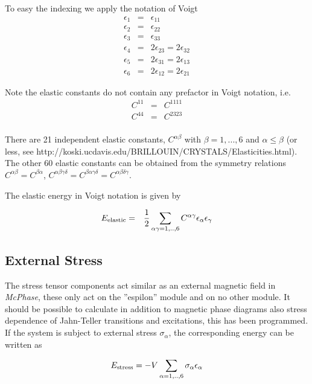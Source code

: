 To easy the indexing we apply the notation of Voigt
\begin{eqnarray}\label{voigt}
\epsilon_1&=&\epsilon_{11}  \\
\epsilon_2&=&\epsilon_{22} \nonumber \\
\epsilon_3&=&\epsilon_{33}\nonumber \\
\epsilon_4&=&2\epsilon_{23}=2\epsilon_{32}\nonumber \\
\epsilon_5&=&2\epsilon_{31}=2\epsilon_{13}\nonumber \\
\epsilon_6&=&2\epsilon_{12}=2\epsilon_{21} \nonumber
\end{eqnarray}

Note the elastic constants do not contain any prefactor in Voigt notation, i.e.
\begin{eqnarray}\label{voigtel}
C^{11}&=&C^{1111} \\
C^{44}&=&C^{2323} \nonumber \\
\end{eqnarray}

There are 21 independent elastic constants, $C^{\alpha\beta}$ with $\beta=1,...,6$ and
$\alpha \le \beta$ (or less, see  http://koski.ucdavis.edu/BRILLOUIN/CRYSTALS/Elasticities.html). The other 60 elastic constants 
can be obtained from the symmetry relations $C^{\alpha\beta}=C^{\beta\alpha}$, 
$C^{\alpha\beta\gamma\delta}=C^{\beta\alpha\gamma\delta}=C^{\alpha\beta\delta\gamma}$.

The elastic energy in Voigt notation is given by

\begin{eqnarray}\label{Eelconstvoigt}
E_{\rm elastic} &=& \frac{1}{2}\sum_{\alpha\gamma=1,..,6} C^{\alpha\gamma} \epsilon_{\alpha}\epsilon_{\gamma}
\end{eqnarray}

\subsection{External Stress}

The stress tensor components  act similar as an external magnetic field in {\em McPhase}, 
these  only act on the
''espilon'' module and on no other module. It should be possible to calculate 
in addition to magnetic phase diagrams also stress dependence
of Jahn-Teller transitions and excitations, this has been programmed. 
If the system is subject to external stress $\sigma_{\alpha}$, the corresponding energy can be written as

\begin{equation}
E_{\rm stress}= -V\sum_{\alpha=1,..,6} \sigma_{\alpha} \epsilon_{\alpha}
\end{equation}

